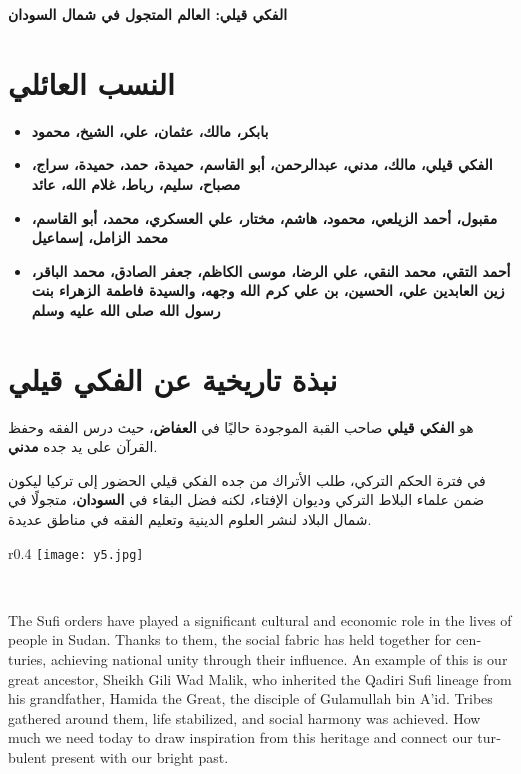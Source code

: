 \documentclass[12pt]{article}
\begin{document}
\begin{center}
    {\Huge\textbf{\color{titleColor} الفكي قيلي: العالم المتجول في شمال السودان}}  
    \vspace{0.5cm}
\end{center}

\section*{\color{sectionColor} النسب العائلي}
\begin{itemize}
    \item \textbf{بابكر، مالك، عثمان، علي، الشيخ، محمود}
    \item \textbf{الفكي قيلي، مالك، مدني، عبدالرحمن، أبو القاسم، حميدة، حمد، حميدة، سراج، مصباح، سليم، رباط، غلام الله، عائد}
    \item \textbf{مقبول، أحمد الزيلعي، محمود، هاشم، مختار، علي العسكري، محمد، أبو القاسم، محمد الزامل، إسماعيل}
    \item \textbf{أحمد التقي، محمد النقي، علي الرضا، موسى الكاظم، جعفر الصادق، محمد الباقر، زين العابدين علي، الحسين، بن علي كرم الله وجهه، والسيدة فاطمة الزهراء بنت رسول الله صلى الله عليه وسلم}
\end{itemize}

\section*{\color{sectionColor} نبذة تاريخية عن الفكي قيلي}
هو \textbf{\color{emphasisColor} الفكي قيلي} صاحب القبة الموجودة حاليًا في \textbf{العفاض}، حيث درس الفقه وحفظ القرآن على يد جده \textbf{مدني}.  

في فترة الحكم التركي، طلب الأتراك من جده الفكي قيلي الحضور إلى تركيا ليكون ضمن علماء البلاط التركي وديوان الإفتاء، لكنه فضل البقاء في \textbf{السودان}، متجولًا في شمال البلاد لنشر العلوم الدينية وتعليم الفقه في مناطق عديدة.



\begin{wrapfigure}{r}{0.4\textwidth}
\texttt{[image: y5.jpg]}
\end{wrapfigure}



\begin{english}
\begin{center}
{\Huge\textbf{\textcolor{titleColor}}} \\
\end{center}

The Sufi orders have played a significant cultural and economic role in the lives of people in Sudan. Thanks to them, the social fabric has held together for centuries, achieving national unity through their influence. An example of this is our great ancestor, Sheikh Gili Wad Malik, who inherited the Qadiri Sufi lineage from his grandfather, Hamida the Great, the disciple of Gulamullah bin A'id. Tribes gathered around them, life stabilized, and social harmony was achieved. How much we need today to draw inspiration from this heritage and connect our turbulent present with our bright past.

\end{english}
\end{document}
